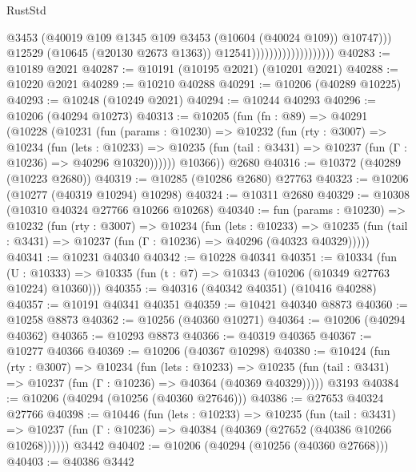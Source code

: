 \begin{lexlean}{RustStd}
\begin{coremodule}
                                              @3453
                                              (@40019
                                                @109
                                                @1345
                                                @109
                                                @3453
                                                (@10604 (@40024 @109))
                                                @10747)))
                                          @12529
                                          (@10645 (@20130 @2673 @1363))
                                          @12541)))))))))))))))))))
@40283 := @10189 @2021
@40287 := @10191 (@10195 @2021) (@10201 @2021)
@40288 := @10220 @2021
@40289 := @10210 @40288
@40291 := @10206 (@40289 @10225)
@40293 := @10248 (@10249 @2021)
@40294 := @10244 @40293
@40296 := @10206 (@40294 @10273)
@40313 := @10205
    (fun (fn : @89) =>
    @40291
      (@10228
        (@10231
          (fun (params : @10230) =>
          @10232
            (fun (rty : @3007) =>
            @10234
              (fun (lets : @10233) =>
              @10235 (fun (tail : @3431) => @10237 (fun (Γ : @10236) => @40296 @10320))))))
        @10366))
    @2680
@40316 := @10372 (@40289 (@10223 @2680))
@40319 := @10285 (@10286 @2680) @27763
@40323 := @10206 (@10277 (@40319 @10294) @10298)
@40324 := @10311 @2680
@40329 := @10308 (@10310 @40324 @27766 @10266 @10268)
@40340 := fun (params : @10230) =>
  @10232
    (fun (rty : @3007) =>
    @10234
      (fun (lets : @10233) =>
      @10235 (fun (tail : @3431) => @10237 (fun (Γ : @10236) => @40296 (@40323 @40329)))))
@40341 := @10231 @40340
@40342 := @10228 @40341
@40351 := @10334
    (fun (U : @10333) => @10335 (fun (t : @7) => @10343 (@10206 (@10349 @27763 @10224) @10360)))
@40355 := @40316 (@40342 @40351) (@10416 @40288)
@40357 := @10191 @40341 @40351
@40359 := @10421 @40340 @8873
@40360 := @10258 @8873
@40362 := @10256 (@40360 @10271)
@40364 := @10206 (@40294 @40362)
@40365 := @10293 @8873
@40366 := @40319 @40365
@40367 := @10277 @40366
@40369 := @10206 (@40367 @10298)
@40380 := @10424
    (fun (rty : @3007) =>
    @10234
      (fun (lets : @10233) =>
      @10235 (fun (tail : @3431) => @10237 (fun (Γ : @10236) => @40364 (@40369 @40329)))))
    @3193
@40384 := @10206 (@40294 (@10256 (@40360 @27646)))
@40386 := @27653 @40324 @27766
@40398 := @10446
    (fun (lets : @10233) =>
    @10235
      (fun (tail : @3431) =>
      @10237 (fun (Γ : @10236) => @40384 (@40369 (@27652 (@40386 @10266 @10268))))))
    @3442
@40402 := @10206 (@40294 (@10256 (@40360 @27668)))
@40403 := @40386 @3442

\end{coremodule}
\end{lexlean}
